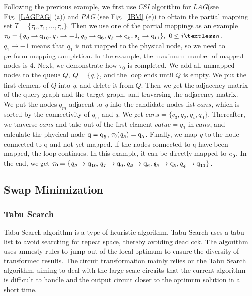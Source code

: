 \documentclass[runningheads]{llncs}
\begin{document}
	\begin{example}
		Following the previous example, we first use  \textit{CSI} algorithm for \textit{LAG}(see Fig.~\ref{LAGPAG} (a)) and \textit{PAG} (see Fig.~\ref{IBM} (e)) to obtain the partial mapping set $T=\{\tau_{0},\tau_{1},...,\tau_{n}\}$. Then we use one of the partial mappings as an example
	$\tau_{0}=\{\textit{q}_\textit{0}\rightarrow \textup{q}_{\textup{10}},\textit{q}_\textit{1}\rightarrow -1,
	\textit{q}_\textit{2}\rightarrow \textup{q}_{\textup{6}},\textit{q}_\textit{3}\rightarrow \textup{q}_{\textup{5}},\textit{q}_\textit{4}\rightarrow \textup{q}_{\textup{11}}\}, \ 0 \le i \textless n$. 
	$\textit{q}_\textit{1}\rightarrow -1$ means that $\textit{q}_\textit{1}$ is not mapped to the physical node, so we need to perform mapping completion. In the example, the maximum number of mapped nodes is 4. Next, we demonstrate how $\tau_{0}$ is completed. We add all unmapped nodes to the queue $Q, \ Q=\{\textit{q}_\textit{1}\}$, and the loop ends until $Q$ is empty. We put the first element of $Q$ into \textit{q}, and delete it from $Q$.  
	Then we get the adjacency matrix of the query graph and the target graph, and traversing the adjacency matrix. We put the nodes  $\textit{q}_\textit{m}$ adjacent to \textit{q} into the candidate nodes list $cans$, which is sorted by the connectivity of $\textit{q}_\textit{m}$ and \textit{q}. We get $cans=\{\textit{q}_\textit{3},\textit{q}_\textit{2},\textit{q}_\textit{4},\textit{q}_\textit{0}\}$. Thereafter, we traverse $cans$ and take out of the first element $value=\textit{q}_\textit{3}$ in $cans$, and calculate the phycical node $\textup{q}=\textup{q}_{\textup{5}}$, $\tau_0(\textit{q}_\textit{3})=\textup{q}_{\textup{5}}$. Finally, we map \textit{q} to the node connected to \textup{q} and not yet mapped. If the nodes connected to \textup{q} have been mapped, the loop continues. In this example, it can be directly mapped to $\textup{q}_{\textup{0}}$. In the end, we get $ \tau_{0}=\{\textit{q}_\textit{0}\rightarrow  \textup{q}_{10},\textit{q}_\textit{1}\rightarrow \textup{q}_{0},	\textit{q}_\textit{2}\rightarrow  \textup{q}_{\textup{6}},\textit{q}_\textit{3}\rightarrow  \textup{q}_{\textup{5}},\textit{q}_\textit{4}\rightarrow  \textup{q}_{\textup{11}}\}$.
	\end{example}
\subsection{Swap Minimization}
\subsubsection{Tabu Search}
Tabu Search algorithm is a type of heuristic algorithm. Tabu Search uses a tabu list to avoid searching for repeat space, thereby avoiding deadlock. The algorithm uses amnesty rules to jump out of the local optimum to ensure the diversity of transformed results. The circuit transformation mainly relies on the Tabu Search algorithm, aiming to deal with the large-scale circuits that the current algorithm is difficult to handle and the output circuit closer to the optimum solution in a short time.
\end{document}
